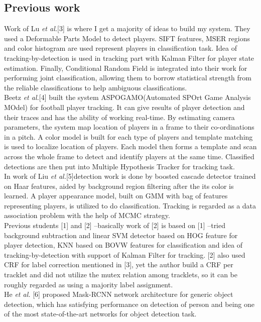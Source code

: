 \documentclass{article}
\begin{document}
\subsection{Previous work}
Work of Lu \textit{et al.}[3] is where I get a majority of ideas to build my system. They used a Deformable Parts Model to detect players. SIFT features, MSER regions and color histogram are used represent players in classification task. Idea of tracking-by-detection is used in tracking part with Kalman Filter for player state estimation. Finally, Conditional Random Field is integrated into their work for performing joint classification, allowing them to borrow statistical strength from the reliable classifications to help ambiguous classifications.\\
Beetz \textit{et al.}[4] built the system ASPOGAMO(Automated SPOrt Game Analysis MOdel) for football player tracking. It can give results of player detection and their traces and has the ability of working real-time. By estimating camera parameters, the system map location of players in a frame to their co-ordinations in a pitch. A color model is built for each type of players and template matching is used to localize location of players. Each model then forms a template and scan across the whole frame to detect and identify players at the same time. Classified detections are then put into Multiple Hypothesis Tracker for tracking task.\\
In work of Liu \textit{et al.}[5]detection work is done by boosted cascade detector trained on Haar features, aided by background region filtering after the its color is learned. A player appearance model, built on GMM with bag of features representing players, is utilized to do classification. Tracking is regarded as a data association problem with the help of MCMC strategy.\\
Previous students [1] and [2] --basically work of [2] is based on [1] --tried background subtraction and linear SVM detector based on HOG feature for player detection, KNN based on BOVW features for classification and idea of tracking-by-detection with support of Kalman Filter for tracking. [2] also used CRF for label correction mentioned in [3], yet the author build a CRF per tracklet and did not utilize the mutex relation among tracklets, so it can be roughly regarded as using a majority label assignment.\\
He \textit{et al.} [6] proposed Mask-RCNN network architecture for generic object detection, which has satisfying performance on detection of person and being one of the most state-of-the-art networks for object detection task.\\
\end{document}
